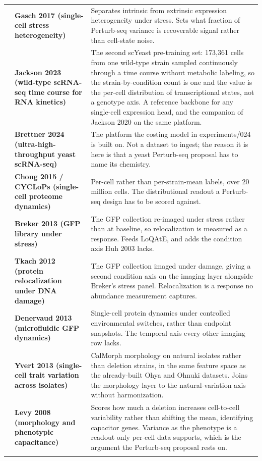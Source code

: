 \begin{longtable}{@{}r@{\hspace{4pt}} L{46mm} L{112mm}@{}}
 & \textbf{Gasch 2017 (single-cell stress heterogeneity)} & Separates intrinsic from extrinsic expression heterogeneity under stress. Sets what fraction of Perturb-seq variance is recoverable signal rather than cell-state noise. \\
 & \textbf{Jackson 2023 (wild-type scRNA-seq time course for RNA kinetics)} & The second scYeast pre-training set: 173,361 cells from one wild-type strain sampled continuously through a time course without metabolic labeling, so the strain-by-condition count is one and the value is the per-cell distribution of transcriptional states, not a genotype axis. A reference backbone for any single-cell expression head, and the companion of Jackson 2020 on the same platform. \\
 & \textbf{Brettner 2024 (ultra-high-throughput yeast scRNA-seq)} & The platform the costing model in experiments/024 is built on. Not a dataset to ingest; the reason it is here is that a yeast Perturb-seq proposal has to name its chemistry. \\
 & \textbf{Chong 2015 / CYCLoPs (single-cell proteome dynamics)} & Per-cell rather than per-strain-mean labels, over 20 million cells. The distributional readout a Perturb-seq design has to be scored against. \\
 & \textbf{Breker 2013 (GFP library under stress)} & The GFP collection re-imaged under stress rather than at baseline, so relocalization is measured as a response. Feeds LoQAtE, and adds the condition axis Huh 2003 lacks. \\
 & \textbf{Tkach 2012 (protein relocalization under DNA damage)} & The GFP collection imaged under damage, giving a second condition axis on the imaging layer alongside Breker's stress panel. Relocalization is a response no abundance measurement captures. \\
 & \textbf{Denervaud 2013 (microfluidic GFP dynamics)} & Single-cell protein dynamics under controlled environmental switches, rather than endpoint snapshots. The temporal axis every other imaging row lacks. \\
 & \textbf{Yvert 2013 (single-cell trait variation across isolates)} & CalMorph morphology on natural isolates rather than deletion strains, in the same feature space as the already-built Ohya and Ohnuki datasets. Joins the morphology layer to the natural-variation axis without harmonization. \\
 & \textbf{Levy 2008 (morphology and phenotypic capacitance)} & Scores how much a deletion increases cell-to-cell variability rather than shifting the mean, identifying capacitor genes. Variance as the phenotype is a readout only per-cell data supports, which is the argument the Perturb-seq proposal rests on. \\
\addlinespace[5pt]
\addlinespace[4pt]
\end{longtable}
\endgroup
